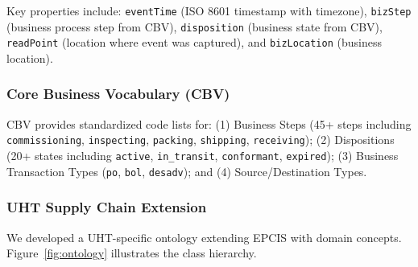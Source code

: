 \documentclass[preprint,review,12pt,authoryear]{elsarticle}
\begin{document}
Key properties include: \texttt{eventTime} (ISO 8601 timestamp with timezone), \texttt{bizStep} (business process step from CBV), \texttt{disposition} (business state from CBV), \texttt{readPoint} (location where event was captured), and \texttt{bizLocation} (business location).

\subsubsection{Core Business Vocabulary (CBV)}

CBV provides standardized code lists for: (1) Business Steps (45+ steps including \texttt{commissioning}, \texttt{inspecting}, \texttt{packing}, \texttt{shipping}, \texttt{receiving}); (2) Dispositions (20+ states including \texttt{active}, \texttt{in\_transit}, \texttt{conformant}, \texttt{expired}); (3) Business Transaction Types (\texttt{po}, \texttt{bol}, \texttt{desadv}); and (4) Source/Destination Types.

\subsubsection{UHT Supply Chain Extension}

We developed a UHT-specific ontology extending EPCIS with domain concepts. Figure~\ref{fig:ontology} illustrates the class hierarchy.
\end{document}
